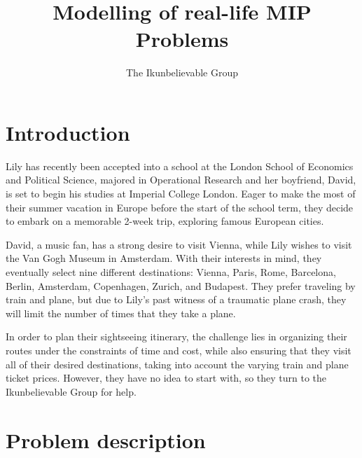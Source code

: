 \documentclass{extarticle}
\title{Modelling of real-life MIP Problems}
\author{The Ikunbelievable Group\footnotemark[1]}
\date{}
\begin{document}
\maketitle

\renewcommand{\thefootnote}{\fnsymbol{footnote}}
\renewcommand{\thefootnote}{\arabic{footnote}}

\section{Introduction}

Lily has recently been accepted into a school at the London School of Economics
and Political Science, majored in Operational Research and her boyfriend,
David, is set to begin his studies at Imperial College London. Eager to make
the most of their summer vacation in Europe before the start of the school
term, they decide to embark on a memorable 2-week trip, exploring famous
European cities.

David, a music fan, has a strong desire to visit Vienna, while Lily wishes to
visit the Van Gogh Museum in Amsterdam. With their interests in mind, they
eventually select nine different destinations: Vienna, Paris, Rome, Barcelona,
Berlin, Amsterdam, Copenhagen, Zurich, and Budapest. They prefer traveling by
train and plane, but due to Lily's past witness of a traumatic plane crash,
they will limit the number of times that they take a plane.

In order to plan their sightseeing itinerary, the challenge lies in organizing
their routes under the constraints of time and cost, while also ensuring that
they visit all of their desired destinations, taking into account the varying
train and plane ticket prices. However, they have no idea to start with, so
they turn to the Ikunbelievable Group for help.

\section{Problem description}
\end{document}

